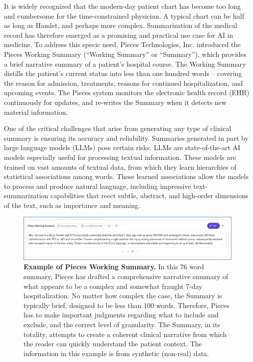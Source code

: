 \documentclass{style/myclass}
\begin{document}
It is widely recognized that the modern-day patient chart has become too long and cumbersome for the time-constrained physician. A typical chart can be half as long as Hamlet, and perhaps more complex.\cite{1} Summarization of the medical record has therefore emerged as a promising and practical use case for AI in medicine. To address this specic need, Pieces Technologies, Inc. introduced the Pieces Working Summary (“Working Summary” or “Summary”), which provides a brief narrative summary of a patient’s hospital course. The Working Summary distills the patient's current status into less than one hundred words – covering the reason for admission, treatments, reasons for continued hospitalization, and upcoming events. The Pieces system monitors the electronic health record (EHR) continuously for updates, and re-writes the Summary when it detects new material information.

One of the critical challenges that arise from generating any type of clinical summary is ensuring its accuracy and reliability. Summaries generated in part by large language models (LLMs) pose certain risks. LLMs are state-of-the-art AI models especially useful for processing textual information. These models are trained on vast amounts of textual data, from which they learn hierarchies of statistical associations among words. These learned associations allow the models to process and produce natural language, including impressive text-summarization capabilities that reect subtle, abstract, and high-order dimensions of the text, such as importance and meaning.\cite{2}

\begin{figure}
  \centering
  \includegraphics[width=\linewidth]{figure/Picture1.png}
  \caption{\textbf{Example of Pieces Working Summary.} In this 76 word summary, Pieces has drafted a comprehensive narrative summary of what appears to be a complex and somewhat fraught 7-day hospitalization. No matter how complex the case, the Summary is typically brief, designed to be less than 100 words. Therefore, Pieces has to make important judgments regarding what to include and exclude, and the correct level of granularity. The Summary, in its totality, attempts to create a coherent clinical narrative from which the reader can quickly understand the patient context. The information in this example is from synthetic (non-real) data.}
  \label{fig:1}
\end{figure}
\end{document}
